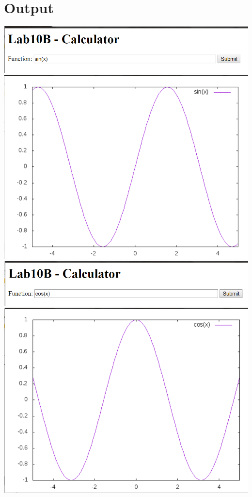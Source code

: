 \documentclass{article}
\begin{document}
\newpage\section*{Output}
\includegraphics[width=\textwidth]{Output_1.png}
\includegraphics[width=\textwidth]{Output_1_2.png}
\newpage
\includegraphics[width=\textwidth]{Output_2.png}
\includegraphics[width=\textwidth]{Output_2_2.png}

\marginnote{}
\end{document}
